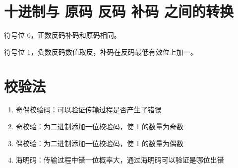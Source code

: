 \section{十进制与 原码 反码 补码 之间的转换}

符号位 0，正数反码补码和原码相同。

符号位 1，负数反码数值取反，补码在反码最低有效位上加一。

\section{校验法}

\begin{enumerate}

    \item 奇偶校验码：可以验证传输过程是否产生了错误
    \item 奇校验：为二进制添加一位校验码，使 1 的数量为奇数
    \item 偶校验：为二进制添加一位校验码，使 1 的数量为偶数
    \item 海明码：传输过程中错一位概率大，通过海明码可以验证是哪位出错

\end{enumerate}

\newpage
